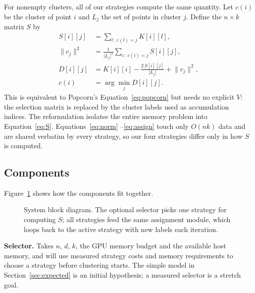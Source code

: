 \documentclass[sigconf]{acmart}
\begin{document}
For nonempty clusters, all of our strategies compute the same quantity. Let
$c(i)$ be the cluster of point $i$ and $L_j$ the set of points in cluster $j$.
Define the $n \times k$ matrix $S$ by
\begin{align}
  S[i][j] &= \sum_{l \,:\, c(l) = j} K[i][l], \label{eq:S}\\
  \lVert c_j \rVert^2
          &= \frac{1}{\lvert L_j \rvert^{2}}
             \sum_{i \,:\, c(i) = j} S[i][j], \label{eq:norm}\\
  D[i][j] &= K[i][i] - \frac{2\,S[i][j]}{\lvert L_j \rvert}
             + \lVert c_j \rVert^{2}, \label{eq:D}\\
  c(i)    &= \arg\min_j D[i][j]. \label{eq:assign}
\end{align}
This is equivalent to Popcorn's Equation~\eqref{eq:popcorn} but needs no
explicit $V$: the selection matrix is replaced by the cluster labels used as
accumulation indices. The reformulation isolates the entire memory problem
into Equation~\eqref{eq:S}. Equations~\eqref{eq:norm}
--\eqref{eq:assign} touch only $O(nk)$ data and are shared verbatim by every
strategy, so our four strategies differ only in how $S$ is computed.

\subsection{Components}

Figure~\ref{fig:arch} shows how the components fit together.

\begin{figure}[t]
  \centering
  
  \caption{System block diagram. The optional selector picks one strategy for
    computing $S$; all strategies feed the same assignment module, which loops
    back to the active strategy with new labels each iteration.}
  \label{fig:arch}
\end{figure}

\textbf{Selector.} Takes $n$, $d$, $k$, the GPU memory budget and the available
host memory, and will use measured strategy costs and memory requirements to
choose a strategy before clustering starts. The simple model in
Section~\ref{sec:expected} is an initial hypothesis; a measured selector is a
stretch goal.
\end{document}
